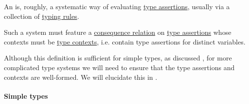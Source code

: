 \begin{definition}\label{def:abstract_type_system}\mimprovised
  An  is, roughly, a systematic way of evaluating \hyperref[def:type_assertion]{type assertions}, usually via a collection of \hyperref[con:typing_rule]{typing rules}.

  Such a system must feature a \hyperref[def:consequence_relation]{consequence relation} on \hyperref[def:type_assertion]{type assertions} whose contexts must be \hyperref[def:type_context]{type contexts}, i.e. contain type assertions for distinct variables.
\end{definition}
\begin{comments}
  \item Although this definition is sufficient for simple types, as discussed , for more complicated type systems we will need to ensure that the type assertions and contexts are well-formed. We will elucidate this in .
\end{comments}

\paragraph{Simple types}

